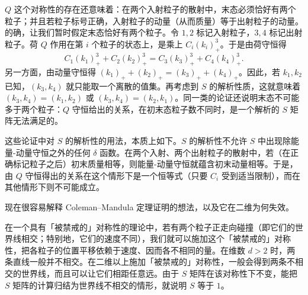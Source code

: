$Q$ 这个对称性的存在还意味着：在两个入射粒子的散射中，末态必须恰好有两个粒子；并且若粒子标号正确，入射粒子的动量（从而质量）等于出射粒子的动量。的确，让我们暂时假定末态恰好有两个粒子。令 $1,2$ 标记入射粒子，$3,4$ 标记出射粒子。荷 $Q$ 作用在第 $i$ 个粒子的状态上，是乘上 $C_i(k_i)_+^3$。于是由荷守恒得
\[
C_1(k_1)_+^3+C_2(k_2)_+^3=C_3(k_3)_+^3+C_4(k_4)_+^3 .
\]
另一方面，由动量守恒得 $(k_1)_++(k_2)_+=(k_3)_++(k_4)_+$。因此，若 $k_1,k_2$ 已知，$(k_3,k_4)$ 就只能取一个离散的值集。再考虑到 $S$ 的解析性质，这就意味着 $(k_3,k_4)=(k_1,k_2)$ 或 $(k_3,k_4)=(k_2,k_1)$。同一类的论证还说明末态不可能多于两个粒子：$Q$ 守恒给出的关系，在初末态粒子数不同时，是一个解析的 $S$ 矩阵无法满足的。



这些论证中对 $S$ 的解析性的用法，本质上如下。$S$ 的解析性不允许 $S$ 中出现除能量-动量守恒之外的任何 $\delta$ 函数。在两个入射、两个出射粒子的散射中，若（在正确标记粒子之后）初末质量相等，则能量-动量守恒就蕴含初末动量相等。于是，由 $Q$ 守恒得出的关系在这个情形下是一个恒等式（只要 $C_i$ 受到适当限制），而在其他情形下则不可能成立。

现在很容易解释 Coleman–Mandula 定理证明的想法，以及它在二维为何失效。

在一个具有「被禁戒的」对称性的理论中，若有两个粒子正走向碰撞（即它们的世界线相交；特别地，它们的速度不同），我们就可以施加这个「被禁戒的」对称性，把各粒子的位置平移依赖于速度、因而各不相同的量。在维数 $d>2$ 时，两条直线一般并不相交。在二维以上施加「被禁戒的」对称性，一般会得到两条不相交的世界线，而且可以让它们相距任意远。由于 $S$ 矩阵在该对称性下不变，能把 $S$ 矩阵的计算归结为世界线不相交的情形，就说明 $S$ 等于 $1$。

